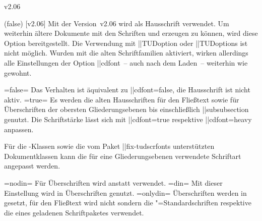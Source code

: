 \begin{Changes}{v2.06}
\begin{Declaration}
  {}
  (false)
  [v2.06]
\printdeclarationlist
%
Mit der Version~v2.06 wird \OpenSans als Hausschrift verwendet. Um weiterhin 
ältere Dokumente mit den Schriften \Univers und \DIN erzeugen zu können, wird 
diese Option bereitgestellt.
Die Verwendung mit \Macro||{TUDoption} oder \Macro||{TUDoptions} ist nicht 
möglich. Wurden mit  die alten Schriftfamilien aktiviert, 
wirken allerdings alle Einstellungen der Option \Option||{cdfont}~-- auch nach 
dem Laden~-- weiterhin wie gewohnt.
%
\begin{DeclareValues}
\itemval=false=
  Das Verhalten ist äquivalent zu \Option||{cdfont=false}, die Hausschrift ist 
  nicht aktiv.
\itemval*=true=
  Es werden die alten Hausschriften \Univers für den Fließtext sowie \DIN für 
  Überschriften der obersten Gliederungsebenen bis einschließlich 
  \Macro||{subsubsection} genutzt. Die Schriftstärke lässt sich mit 
  \Option||{cdfont=true} respektive \Option||{cdfont=heavy} anpassen.
\end{DeclareValues}
%
Für die \TUDScript-Klassen sowie die vom Paket \Package||{fix-tudscrfonts} 
unterstützten Dokumentklassen kann die für eine Gliederungsebenen verwendete 
Schriftart angepasst werden.
%
\begin{DeclareValues}
\itemval=nodin=
  Für Überschriften wird \Univers anstatt \DIN verwendet.
\itemval=din=
  Mit dieser Einstellung wird \DIN in Überschriften genutzt. 
\itemval=onlydin=
  Überschriften werden in \DIN gesetzt, für den Fließtext wird nicht \Univers 
  sondern die "=Standardschriften respektive die eines geladenen 
  Schriftpaketes verwendet.
\end{DeclareValues}
\end{Declaration}


\end{Changes}
